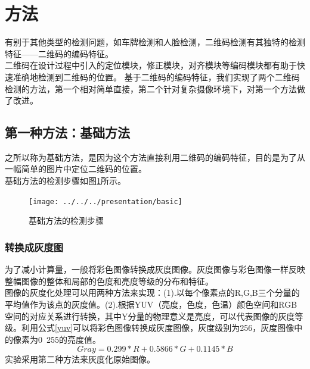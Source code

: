 \section{方法}
有别于其他类型的检测问题，如车牌检测和人脸检测，二维码检测有其独特的检测特征——二维码的编码特征。\\
二维码在设计过程中引入的定位模块，修正模块，对齐模块等编码模块都有助于快速准确地检测到二维码的位置。
基于二维码的编码特征，我们实现了两个二维码检测的方法，第一个相对简单直接，第二个针对复杂摄像环境下，对第一个方法做了改进。

\subsection{第一种方法：基础方法}
之所以称为基础方法，是因为这个方法直接利用二维码的编码特征，目的是为了从一幅简单的图片中定位二维码的位置。\\
基础方法的检测步骤如图\ref{fig:basic}所示。

\begin{figure}[h]
\centering
\texttt{[image: ../../../presentation/basic]}
\caption[steps]{基础方法的检测步骤}
\label{fig:basic}
\end{figure}

\subsubsection{转换成灰度图}
为了减小计算量，一般将彩色图像转换成灰度图像。灰度图像与彩色图像一样反映整幅图像的整体和局部的色度和亮度等级的分布和特征。\\
图像的灰度化处理可以用两种方法来实现：(1).以每个像素点的R,G,B三个分量的平均值作为该点的灰度值。(2).根据YUV（亮度，色度，色温）颜色空间和RGB空间的对应关系进行转换，其中Y分量的物理意义是亮度，可以代表图像的灰度等级。利用公式\ref{yuv}可以将彩色图像转换成灰度图像，灰度级别为256，灰度图像中的像素为0~255的亮度值。
\begin{equation}\label{yuv}
Gray = 0.299 * R + 0.5866 * G + 0.1145 * B
\end{equation}
实验采用第二种方法来灰度化原始图像。

